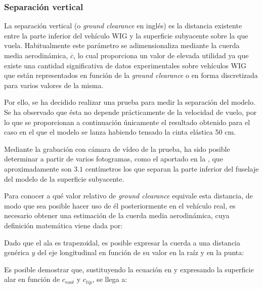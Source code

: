 \subsubsection{Separación vertical}
\label{sec:tests:results:clearance}

La separación vertical (o \emph{ground clearance} en inglés) es la distancia existente entre la parte inferior del vehículo WIG y la superficie subyacente sobre la que vuela. Habitualmente este parámetro se adimensionaliza mediante la cuerda media aerodinámica, $\overline{c}$, lo cual proporciona un valor de elevada utilidad ya que existe una cantidad significativa de datos experimentales sobre vehículos WIG que están representados en función de la \emph{ground clearance} o en forma discretizada para varios valores de la misma.

Por ello, se ha decidido realizar una prueba para medir la separación del modelo. Se ha observado que ésta no depende prácticamente de la velocidad de vuelo, por lo que se proporcionan a continuación únicamente el resultado obtenido para el caso en el que el modelo se lanza habiendo tensado la cinta elástica 50 cm.

Mediante la grabación con cámara de vídeo de la prueba, ha sido posible determinar a partir de varios fotogramas, como el aportado en la , que aproximadamente son $3.1$ centímetros los que separan la parte inferior del fuselaje del modelo de la superficie subyacente.


Para conocer a qué valor relativo de \emph{ground clearance} equivale esta distancia, de modo que sea posible hacer uso de él posteriormente en el vehículo real, es necesario obtener una estimación de la cuerda media aerodinámica, cuya definición matemática viene dada por:

Dado que el ala es trapezoidal, es posible expresar la cuerda a una distancia genérica $y$ del eje longitudinal en función de su valor en la raíz y en la punta:

Es posible demostrar que, sustituyendo la ecuación  en  y expresando la superficie alar en función de $c_{root}$ y $c_{tip}$, se llega a:

